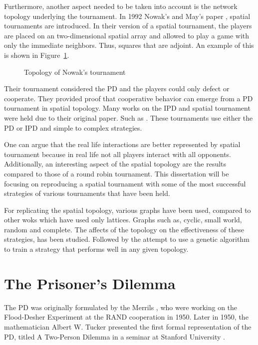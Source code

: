 Furthermore, another aspect needed to be taken into account is the network
topology underlying the tournament. In 1992 Nowak's and May's paper \cite{Nowak1992},
spatial tournaments are introduced. In their version of a spatial tournament,
the players are placed on an two-dimensional spatial array and allowed to play a
game with only the immediate neighbors. Thus, squares that are adjoint.
An example of this is shown in Figure~\ref{fig:nowak-example}.

\begin{figure}[!hbtp]
	\centering
		
		\caption{Topology of Nowak's tournament}
  \label{fig:nowak-example}
\end{figure}

Their tournament considered the PD and the players could only defect or
cooperate.  They provided proof that cooperative behavior can emerge from a PD
tournament in spatial topology. Many works on the IPD and spatial tournament
were held due to their original paper. Such as \cite{Grujic2014, Nowak1993,
Maciver1992, Nowak1992, Brauchli1999, Meng2015, Lindgren1994}.
These tournaments use either the PD or IPD and simple to complex strategies.

One can argue that the real life interactions are better represented by spatial
tournament because in real life not all players interact with all opponents.
Additionally, an interesting aspect of the spatial topology are the results
compared to those of a round robin tournament. This dissertation will be focusing on
reproducing a spatial tournament with some of the most successful strategies of
various tournaments that have been held.

For replicating the spatial topology, various graphs have been used, compared to
other woks which have used only lattices. Graphs such as, cyclic,
small world, random and complete. The affects of the topology on the
effectiveness of these strategies, has been studied. Followed by the attempt to
use a genetic algorithm to train a strategy that performs well in any given
topology.

\section{The Prisoner's Dilemma}
\label{sub:prisoner-dilemma}
The PD was originally formulated by the Merrils \cite{Flood1958},
who were working on the Flood-Desher Experiment at the RAND cooperation in 1950.
Later in 1950, the mathematician Albert W. Tucker presented the first formal
representation of the PD, titled  A Two-Person Dilemma in a seminar at
Stanford University \cite{GassAssad2005}.

